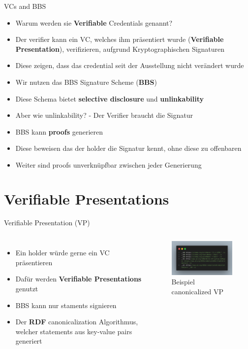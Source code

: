 \documentclass[
	german,%
	authorontitle=true,
	]{bfhbeamer}
\begin{document}
\begin{frame}{VCs and BBS}
    \begin{itemize}
        \item Warum werden sie \textbf{Verifiable} Credentials genannt?
        \item Der verifier kann ein VC, welches ihm präsentiert wurde (\textbf{Verifiable Presentation}), verifizieren, aufgrund Kryptographischen Signaturen
        \item Diese zeigen, dass das credential seit der Ausstellung nicht verändert wurde
        \item Wir nutzen das BBS Signature Scheme (\textbf{BBS}) 
        \item Diese Schema bietet \textbf{selective disclosure} und \textbf{unlinkability}
        \item Aber wie unlinkability? - Der Verifier braucht die Signatur
        \item BBS kann \textbf{proofs} generieren
        \item Diese beweisen das der holder die Signatur kennt, ohne diese zu offenbaren
        \item Weiter sind proofs unverknüpfbar zwischen jeder Generierung
    \end{itemize}
\end{frame}

\section{Verifiable Presentations}

\begin{frame}{Verifiable Presentation (VP)}
    \begin{columns}[onlytextwidth,T]
        \column{70mm}  
        \begin{itemize}
            \item Ein holder würde gerne ein VC präsentieren
            \item Dafür werden \textbf{Verifiable Presentations} genutzt
            \item BBS kann nur staments signieren
            \item Der \textbf{RDF} canonicalization Algorithmus, welcher statements aus key-value pairs generiert
        \end{itemize}

        \column{70mm}

        \begin{figure}
            \centering
            \includegraphics[width=70mm]{../img/VPcanon.png}
            \caption{Beispiel canonicalized VP}
        \end{figure}

    \end{columns}
\end{frame}
\end{document}
